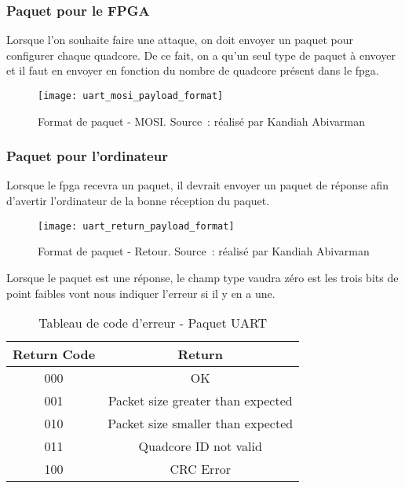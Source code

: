 \subsubsection{Paquet pour le FPGA}

Lorsque l'on souhaite faire une attaque, on doit envoyer un paquet pour configurer chaque quadcore.
De ce fait, on a qu'un seul type de paquet à envoyer et il faut en envoyer en fonction du nombre de quadcore présent dans le \gls{fpga}.

\begin{figure}[tbph!]
	\centering
	\texttt{[image: uart\_mosi\_payload\_format]}
	\caption[Format de paquet - MOSI]{Format de paquet - MOSI. Source : réalisé par Kandiah Abivarman}
	\label{fig:uart_mosi_payload_format}
\end{figure}

\newpage

\subsubsection{Paquet pour l'ordinateur}

Lorsque le \gls{fpga} recevra un paquet, il devrait envoyer un paquet de réponse afin d'avertir l'ordinateur de la bonne réception du paquet.

\begin{figure}[tbph!]
	\centering
	\texttt{[image: uart\_return\_payload\_format]}
	\caption[Format de paquet - Retour]{Format de paquet - Retour. Source : réalisé par Kandiah Abivarman}
	\label{fig:uart_return_payload_format}
\end{figure}

Lorsque le paquet est une réponse, le champ type vaudra zéro est les trois bits de point faibles vont nous indiquer l'erreur si il y en a une.\\

\begin{table}[tbph!]
	\centering
	\begin{tabular}{|c|c|}
	\hline
	\textbf{Return Code} & \textbf{Return}                   \\ \hline
	000                  & OK                                \\ \hline
	001                  & Packet size greater than expected \\ \hline
	010                  & Packet size smaller than expected \\ \hline
	011                  & Quadcore ID not valid             \\ \hline
	100                  & CRC Error                         \\ \hline
	\end{tabular}
	\caption{Tableau de code d'erreur - Paquet UART}
	\label{tab:error_code_uart}
\end{table}

